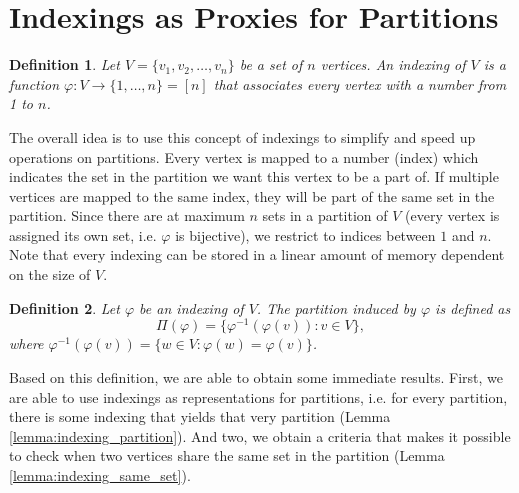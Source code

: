 \documentclass[11pt,a4paper]{article}
\numberwithin{equation}{section}
\newcommand{\idx}{\varphi}
\newtheorem{definition}{Definition}[section]
\begin{document}

\section{Indexings as Proxies for Partitions}

\begin{definition}
    Let $V = \{ v_1,v_2,\dots, v_n \}$ be a set of $n$ vertices. An indexing of $V$ is a function $\idx: V \rightarrow \{ 1,\dots,n \} = [n]$ that associates every vertex with a number from 1 to $n$.
\end{definition}

The overall idea is to use this concept of indexings to simplify and speed up operations on partitions. Every vertex is mapped to a number (index) which indicates the set in the partition we want this vertex to be a part of. If multiple vertices are mapped to the same index, they will be part of the same set in the partition. Since there are at maximum $n$ sets in a partition of $V$ (every vertex is assigned its own set, i.e. $\idx$ is bijective), we restrict to indices between $1$ and $n$. Note that every indexing can be stored in a linear amount of memory dependent on the size of $V$.

\begin{definition}
    Let $\idx$ be an indexing of $V$. The partition induced by $\idx$ is defined as
    \begin{equation}
        \Pi(\idx)= \{ \idx^{-1}(\idx(v)) : v \in V \}, \label{eq:indexing}
    \end{equation}
    where $\idx^{-1}(\idx(v)) = \{ w \in V : \idx(w) = \idx(v) \}$.
\end{definition}

Based on this definition, we are able to obtain some immediate results. First, we are able to use indexings as representations for partitions, i.e. for every partition, there is some indexing that yields that very partition (Lemma \ref{lemma:indexing_partition}). And two, we obtain a criteria that makes it possible to check when two vertices share the same set in the partition (Lemma \ref{lemma:indexing_same_set}).  
\end{document}
